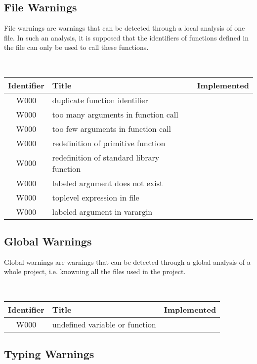\subsection{File Warnings}

File warnings are warnings that can be detected through a local
analysis of one file. In such an analysis, it is supposed that the
identifiers of functions defined in the file can only be used to call
these functions.

\noindent\\\begin{tabular}{|c|p{8cm}|c|} \hline
Identifier & Title & Implemented      \\ \hline
W000 & duplicate function identifier &  \\ \hline
W000 & too many arguments in function call &  \\ \hline
W000 & too few arguments in function call  &  \\ \hline
W000 & redefinition of primitive function &  \\ \hline
W000 & redefinition of standard library function &  \\ \hline
W000 & labeled argument does not exist &  \\ \hline
W000 & toplevel expression in file &  \\ \hline
W000 & labeled argument in varargin &  \\ \hline
\end{tabular}

\subsection{Global Warnings}

Global warnings are warnings that can be detected through a global
analysis of a whole project, i.e. knowning all the files used in the
project.

\noindent\\\begin{tabular}{|c|p{8cm}|c|} \hline
Identifier & Title & Implemented      \\ \hline
W000 & undefined variable or function &  \\ \hline
\end{tabular}

\subsection{Typing Warnings}



